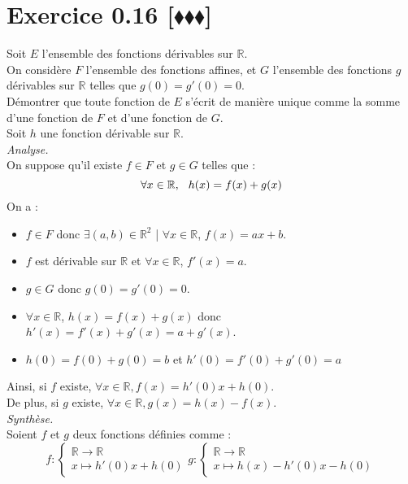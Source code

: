 \documentclass[10pt]{article}
\begin{document}
\section*{Exercice 0.16 [$\blacklozenge\blacklozenge\blacklozenge$]}
\begin{tcolorbox}[enhanced, width=7in, center, size=fbox, fontupper=\large, drop shadow southwest]
    Soit $E$ l'ensemble des fonctions dérivables sur $\mathbb{R}$.\\
    On considère $F$ l'ensemble des fonctions affines, et $G$ l'ensemble des fonctions $g$ dérivables sur $\mathbb{R}$ telles que $g(0)=g'(0)=0$.\\
    Démontrer que toute fonction de $E$ s'écrit de manière unique comme la somme d'une fonction de $F$ et d'une fonction de $G$.\\[0.5cm]
    Soit $h$ une fonction dérivable sur $\mathbb{R}$.\\
    \emph{Analyse.}\\
    On suppose qu'il existe $f\in F$ et $g\in G$ telles que :
    \begin{equation*}
        \forall{x\in\mathbb{R}}, \hspace{0.25cm} h(x)=f(x)+g(x)
    \end{equation*}
    On a :
    \begin{itemize}
        \item $f\in F$ donc $\exists(a,b)\in\mathbb{R}^2$ | $\forall{x\in\mathbb{R}}$, $f(x)=ax+b$.
        \item $f$ est dérivable sur $\mathbb{R}$ et $\forall{x\in\mathbb{R}}$, $f'(x)=a$.
        \item $g\in G$ donc $g(0)=g'(0)=0$.  
        \item $\forall{x\in\mathbb{R}}$, $h(x)=f(x)+g(x)$ donc $h'(x)=f'(x)+g'(x)=a+g'(x)$.
        \item $h(0)=f(0)+g(0)=b$ et $h'(0)=f'(0)+g'(0)=a$
    \end{itemize}
    Ainsi, si $f$ existe, $\forall{x\in\mathbb{R}}, f(x) = h'(0)x+h(0)$.\\
    De plus, si $g$ existe, $\forall{x\in\mathbb{R}}, g(x) = h(x)-f(x)$.\\[0.5cm]
    \emph{Synthèse.}\\
    Soient $f$ et $g$ deux fonctions définies comme :
    \begin{equation*}
        f:\begin{cases}\mathbb{R}\rightarrow\mathbb{R}\\x\mapsto h'(0)x+h(0)\end{cases} g:\begin{cases}\mathbb{R}\rightarrow\mathbb{R}\\x\mapsto h(x)-h'(0)x-h(0)\end{cases}

\end{equation*}
\end{tcolorbox}
\end{document}
